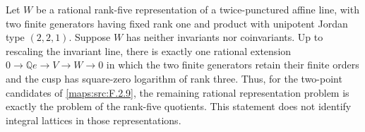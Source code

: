 \begin{proposition}\label{maps:src:F.2.11}


Let $W$ be a rational rank-five representation of a
twice-punctured affine line, with two finite generators
having fixed rank one and product with unipotent Jordan type
$(2,2,1)$.  Suppose $W$ has neither invariants nor
coinvariants.  Up to rescaling the invariant line, there is
exactly one rational extension
$0\to\mathbb Qe\to V\to W\to0$ in which the two finite
generators retain their finite orders and the cusp has
square-zero logarithm of rank three.  Thus, for the
two-point candidates of \ref{maps:src:F.2.9}, the remaining rational
representation problem is exactly the problem of the
rank-five quotients.  This statement does not identify
integral lattices in those representations.

\end{proposition}


